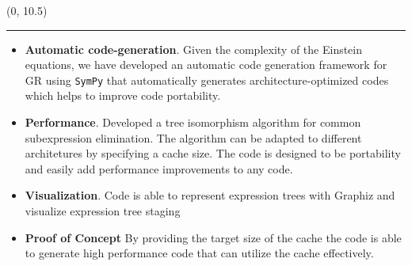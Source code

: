 \documentclass[landscape]{a0poster}
\def\Subhead#1{\noindent{\textbf{\Large\color{DarkBlue} #1}}\medskip}
\begin{document}
	\begin{textblock}{14}(0, 10.5)
		{\color{DarkBlue}\hrule}\medskip
		\Subhead{Contributions}
		\vspace{-0.2in}
		\begin{itemize}
			\item \textbf{Automatic code-generation}. Given the complexity of the Einstein equations, we have developed an automatic code generation framework for GR using \texttt{SymPy} that automatically generates architecture-optimized codes which helps to improve code portability. 
			\item \textbf{Performance}. Developed a tree isomorphism algorithm for common subexpression elimination. The algorithm can be adapted to different architetures by specifying a cache size. The code is designed to be portability and easily add performance improvements to any code.
			\item \textbf{Visualization}. 
			Code is able to represent expression trees with Graphiz and visualize expression tree staging	
			\item \textbf{Proof of Concept} 
			By providing the target size of the cache the code is able to generate high performance code that can utilize the cache effectively.
			
			
		
		\end{itemize}
		
	\end{textblock}
	
\end{document}

